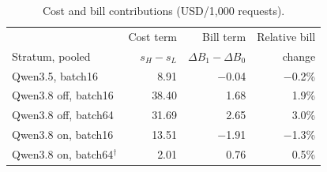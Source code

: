 
\begin{table}[t]
\caption{Cost and bill contributions (USD/1,000 requests).}
\label{tab:margin}
\centering\small\setlength{\tabcolsep}{3pt}
\begin{tabular}{lrrr}
\toprule
 & Cost term & Bill term & Relative bill \\
Stratum, pooled & $s_H-s_L$ & $\Delta B_1-\Delta B_0$ & change \\
\midrule
Qwen3.5, batch16 & 8.91 & $-$0.04 & $-$0.2\% \\
Qwen3.8 off, batch16 & 38.40 & 1.68 & 1.9\% \\
Qwen3.8 off, batch64 & 31.69 & 2.65 & 3.0\% \\
Qwen3.8 on, batch16 & 13.51 & $-$1.91 & $-$1.3\% \\
Qwen3.8 on, batch64$^\dagger$ & 2.01 & 0.76 & 0.5\% \\
\bottomrule
\end{tabular}
\end{table}
